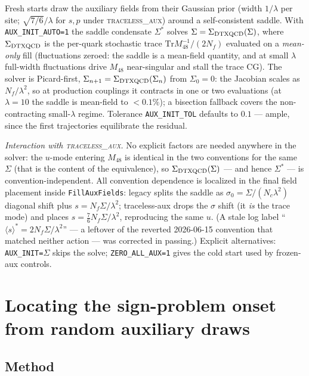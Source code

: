 \documentclass[11pt]{article}
\newcommand{\Tr}{\mathrm{Tr}}
\newcommand{\Sig}{\Sigma}
\begin{document}
Fresh starts draw the auxiliary fields from their Gaussian prior (width
$1/\lambda$ per site; $\sqrt{7/6}/\lambda$ for $s,p$ under
\textsc{traceless\_aux}) around a self-consistent saddle.  With
\texttt{AUX\_INIT\_AUTO=1} the saddle condensate $\Sig^{*}$ solves
$\Sig=\Sig_{\rm DTXQCD}(\Sig)$, where $\Sig_{\rm DTXQCD}$ is the per-quark
stochastic trace $\Tr M_{48}^{-1}/(2N_{f})$ evaluated on a \emph{mean-only}
fill (fluctuations zeroed: the saddle is a mean-field quantity, and at
small $\lambda$ full-width fluctuations drive $M_{48}$ near-singular and
stall the trace CG).  The solver is Picard-first,
$\Sig_{n+1}=\Sig_{\rm DTXQCD}(\Sig_{n})$ from $\Sig_{0}=0$: the Jacobian
scales as $N_{f}/\lambda^{2}$, so at production couplings it contracts in
one or two evaluations (at $\lambda=10$ the saddle is mean-field to
$<0.1\%$); a bisection fallback covers the non-contracting small-$\lambda$
regime.  Tolerance \texttt{AUX\_INIT\_TOL} defaults to $0.1$ --- ample,
since the first trajectories equilibrate the residual.

\emph{Interaction with \textsc{traceless\_aux}.}  No explicit factors are
needed anywhere in the solver: the $u$-mode entering $M_{48}$ is identical
in the two conventions for the same $\Sig$ (that is the content of the
equivalence), so $\Sig_{\rm DTXQCD}(\Sig)$ --- and hence $\Sig^{*}$ --- is
convention-independent.  All convention dependence is localized in the
final field placement inside \texttt{FillAuxFields}: legacy splits the
saddle as $\sigma_{0}=\Sig/(N_{c}\lambda^{2})$ diagonal shift plus
$s=N_{f}\Sig/\lambda^{2}$; traceless-aux drops the $\sigma$ shift (it
\emph{is} the trace mode) and places
$s=\tfrac{7}{6}N_{f}\Sig/\lambda^{2}$, reproducing the same $u$.  (A stale
log label ``$\langle s\rangle^{*}=2N_{f}\Sig/\lambda^{2}$'' --- a leftover
of the reverted 2026-06-15 convention that matched neither action --- was
corrected in passing.)  Explicit alternatives: \texttt{AUX\_INIT=}$\Sig$
skips the solve; \texttt{ZERO\_ALL\_AUX=1} gives the cold start used by
frozen-aux controls.

\section{Locating the sign-problem onset from random auxiliary draws}
\label{sec:signboundary}

\subsection{Method}
\end{document}
